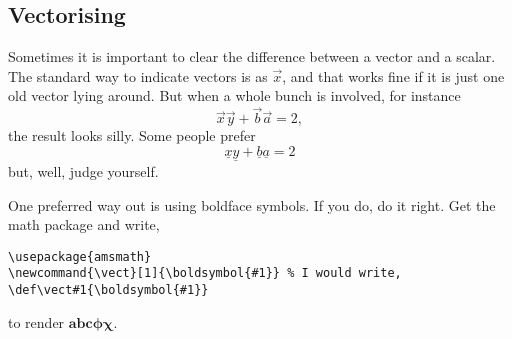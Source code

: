 \documentclass{article}
\begin{document}
\subsection{Vectorising}
Sometimes it is important to clear the difference between a vector and a scalar. The standard way to indicate vectors is as $\vec x$, and that works fine if it is  just one old vector lying around.  But when a whole bunch is involved, for instance $$ \vec x \vec y + \vec b \vec a = 2,$$ the result looks silly.  Some people prefer $$ \underline x \underline y + \underline b \underline a = 2$$ but, well, judge yourself.  

One preferred way out is using boldface symbols.  If you do, do it right.  Get the \AmS math package and write,
\begin{verbatim}
\usepackage{amsmath}
\newcommand{\vect}[1]{\boldsymbol{#1}} % I would write, \def\vect#1{\boldsymbol{#1}}
\end{verbatim}
to render $\boldsymbol{abc\phi\chi}$.
\end{document}
